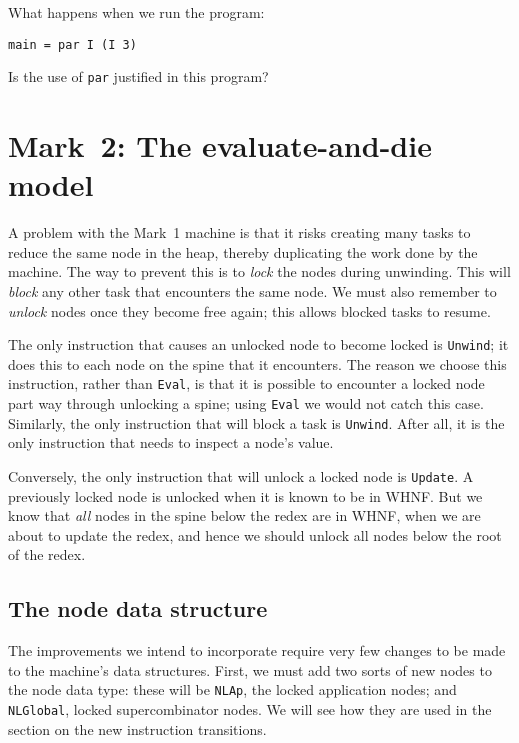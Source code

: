 \begin{exercise}\label{pgm:X:trivial1:1}
What happens when we run the program:
\begin{verbatim}
main = par I (I 3)
\end{verbatim}
Is the use of \mbox{\tt par} justified in this program?
\end{exercise}

\section{Mark~2: The evaluate-and-die model}
\label{pgm:mark2}

A problem with the Mark~1 machine is that it risks creating many tasks
to reduce the same node in the heap, thereby duplicating the work done
by the machine. The way to prevent this is to {\em
lock\/} the nodes during unwinding. This will
{\em block\/} any other task that encounters
the same node. We must also remember to {\em unlock\/} nodes once they become free again; this allows blocked tasks
to resume.

The only instruction that causes an unlocked node to become locked is
\mbox{\tt Unwind}; it does this to each node on the spine that it encounters.
The reason we choose this instruction, rather than \mbox{\tt Eval}, is that it
is possible to encounter a locked node part way through unlocking a
spine; using \mbox{\tt Eval} we would not catch this case.  Similarly, the only
instruction that will block a task is \mbox{\tt Unwind}.  After all, it is the
only instruction that needs to inspect a node's value.

Conversely, the only instruction that will unlock a locked node is
\mbox{\tt Update}. A previously locked node is unlocked when it is known to be
in WHNF. But we know that {\em all\/} nodes in the spine below the redex
are in WHNF, when we are about to update the redex, and hence we
should unlock all nodes below the root of the redex.

\subsection{The node data structure}
\label{pgm:ss:mark2mc}

The improvements we intend to incorporate require very few changes
to be made to the machine's data structures. First, we must add two sorts of
new nodes to the node data type: these will be \mbox{\tt NLAp}, the locked
application nodes; and \mbox{\tt NLGlobal}, locked supercombinator nodes. We
will see how they are used in the section on the new instruction
transitions.

